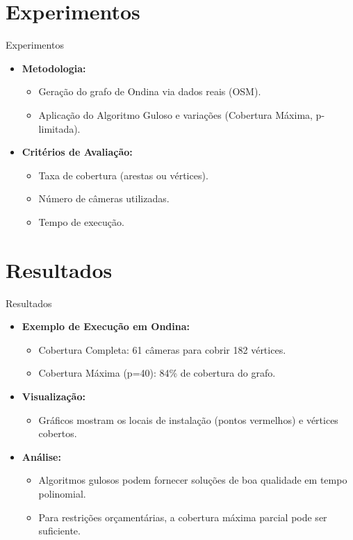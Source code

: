 \documentclass[aspectratio=169,xcolor=table]{beamer}
\begin{document}
\section{Experimentos}
\begin{frame}{Experimentos}
    \begin{itemize}
        \item \textbf{Metodologia:}
        \begin{itemize}
            \item Geração do grafo de Ondina via dados reais (OSM).
            \item Aplicação do Algoritmo Guloso e variações (Cobertura Máxima, p-limitada).
        \end{itemize}
        \item \textbf{Critérios de Avaliação:}
        \begin{itemize}
            \item Taxa de cobertura (arestas ou vértices).
            \item Número de câmeras utilizadas.
            \item Tempo de execução.
        \end{itemize}
    \end{itemize}
\end{frame}

\section{Resultados}
\begin{frame}{Resultados}
    \begin{itemize}
        \item \textbf{Exemplo de Execução em Ondina:}
        \begin{itemize}
            \item Cobertura Completa: 61 câmeras para cobrir 182 vértices.
            \item Cobertura Máxima (p=40): 84\% de cobertura do grafo.
        \end{itemize}
        \item \textbf{Visualização:}
        \begin{itemize}
            \item Gráficos mostram os locais de instalação (pontos vermelhos) e vértices cobertos.
        \end{itemize}
        \item \textbf{Análise:}
        \begin{itemize}
            \item Algoritmos gulosos podem fornecer soluções de boa qualidade em tempo polinomial.
            \item Para restrições orçamentárias, a cobertura máxima parcial pode ser suficiente.
        \end{itemize}
    \end{itemize}
\end{frame}
\end{document}
